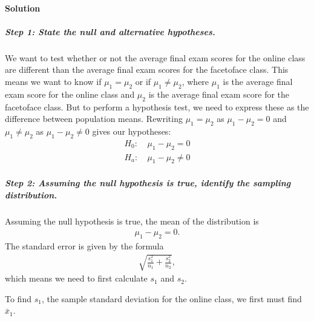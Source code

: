 \documentclass[letterpaper,10pt,english]{jupyterBook}
\begin{document}
\paragraph{Solution}
\label{\detokenize{Ch9 Hypothesis Tests of Two or More Populations/9.1 Hypothesis Testing Two Population Means:id1}}

\subparagraph{Step 1: State the null and alternative hypotheses.}
\label{\detokenize{Ch9 Hypothesis Tests of Two or More Populations/9.1 Hypothesis Testing Two Population Means:id2}}
\sphinxAtStartPar
We want to test whether or not the average final exam scores for the online class are different than the average final exam scores for the face\sphinxhyphen{}to\sphinxhyphen{}face class. This means we want to know if \(\mu_1 = \mu_2\) or if \(\mu_1 \neq \mu_2\), where \(\mu_1\) is the average final exam score for the online class and \(\mu_2\) is the average final exam score for the face\sphinxhyphen{}to\sphinxhyphen{}face class. But to perform a hypothesis test, we need to express these as the difference between population means. Rewriting \(\mu_1 = \mu_2\) as \(\mu_1 - \mu_2 = 0\) and \(\mu_1 \neq \mu_2\) as \(\mu_1 - \mu_2 \neq 0\) gives our hypotheses:
\begin{align*}
H_0:&\ \mu_1 - \mu_2 = 0 \\
H_a:&\ \mu_1 - \mu_2 \neq 0
\end{align*}

\subparagraph{Step 2: Assuming the null hypothesis is true, identify the sampling distribution.}
\label{\detokenize{Ch9 Hypothesis Tests of Two or More Populations/9.1 Hypothesis Testing Two Population Means:id3}}
\sphinxAtStartPar
Assuming the null hypothesis is true, the mean of the distribution is
\begin{equation*}
\begin{split} \mu_1 - \mu_2 = 0. \end{split}
\end{equation*}
\sphinxAtStartPar
The standard error is given by the formula
\begin{equation*}
\begin{split} \sqrt{\frac{s_1^2}{n_1} + \frac{s_2^2}{n_2}}, \end{split}
\end{equation*}
\sphinxAtStartPar
which means we need to first calculate \(s_1\) and \(s_2\).

\sphinxAtStartPar
{}

\sphinxAtStartPar
To find \(s_1\), the sample standard deviation for the online class, we first must find \(\bar{x}_1\).
\end{document}
